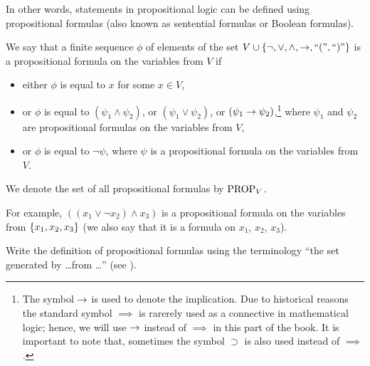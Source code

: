 In other words, statements in propositional logic can be defined using
propositional formulas (also known as sentential formulas or Boolean formulas).
\begin{definition}
  We say that a finite sequence $\phi$ of elements of the set
  $V \cup \set{\lnot, \lor, \land, \limplies, \text{``(''}, \text{``)''}}$
  is a propositional formula on the variables from $V$ if
  \begin{itemize}
    \item either $\phi$ is equal to $x$ for some $x \in V$,
    \item or $\phi$ is equal to $(\psi_1 \land \psi_2)$, or
      $(\psi_1 \lor \psi_2)$, or $(\psi_1 \rightarrow \psi_2)$,\footnote{%
        The symbol $\rightarrow$ is used to denote the implication.
        Due to historical reasons the standard symbol $\implies$ is rarerely
        used as a connective in mathematical logic; hence, we will use
        $\rightarrow$ instead of $\implies$ in this part of the book.
        It is important to note that, sometimes the symbol $\supset$ is also
        used instead of $\implies$.
      }
      where $\psi_1$ and $\psi_2$ are propositional formulas on the variables
      from $V$,
    \item or $\phi$ is equal to $\lnot \psi$, where $\psi$ is a propositional
      formula on the variables from $V$.
  \end{itemize}

  We denote the set of all propositional formulas by $\mathrm{PROP}_{V}$.
\end{definition}

For example, $((x_1 \lor \lnot x_2) \land x_3)$ is a propositional formula on
the variables from $\set{x_1, x_2, x_3}$ (we also say that it is a formula on
$x_1$, $x_2$, $x_3$).

\begin{exercise}
  Write the definition of propositional formulas using the terminology
  ``the set generated by \dots from \dots'' (see ).
\end{exercise}

